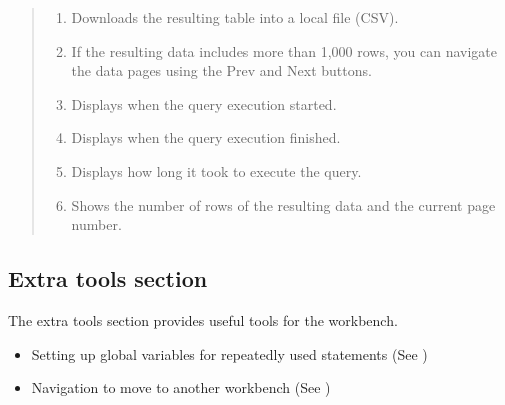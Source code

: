 \documentclass[letterpaper,10pt,english]{sphinxmanual}
\begin{document}
\begin{quote}
\begin{enumerate}
\item {} 
 Downloads the resulting table into a local file (CSV).

\item {} 
 If the resulting data includes more than 1,000 rows, you can navigate the data pages using the Prev and Next buttons.

\item {} 
 Displays when the query execution started.

\item {} 
 Displays when the query execution finished.

\item {} 
 Displays how long it took to execute the query.

\item {} 
 Shows the number of rows of the resulting data and the current page number.

\end{enumerate}
\end{quote}


\subsection{Extra tools section}
\label{\detokenize{discovery/part06/06_03-use_a_workbench:workbench-use-5}}\label{\detokenize{discovery/part06/06_03-use_a_workbench:id8}}
The extra tools section provides useful tools for the workbench.
\begin{itemize}
\item {} 
Setting up global variables for repeatedly used statements (See {\hyperref[\detokenize{discovery/part06/06_03-use_a_workbench:global-variable}]{}})

\item {} 
Navigation to move to another workbench (See {\hyperref[\detokenize{discovery/part06/06_03-use_a_workbench:workbench-navigation}]{}})

\end{itemize}
\end{document}
